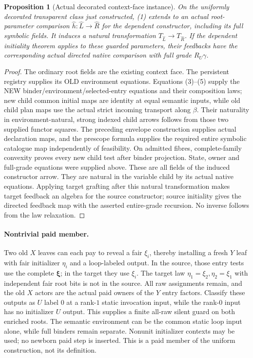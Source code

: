 \documentclass[11pt]{article}
\newtheorem{proposition}{Proposition}
\begin{document}
\begin{proposition}[Actual decorated context-face instance]
On the uniformly decorated transparent class just constructed, (1) extends to an actual root-parameter comparison $\widehat h:\widehat L\to\widehat R$ for the dependent constructor, including its full symbolic fields. It induces a natural transformation $T_{\widehat L}\to T_{\widehat R}$. If the dependent initiality theorem applies to these guarded parameters, their feedbacks have the corresponding actual directed native comparison with full grade $R_U\gamma$.
\end{proposition}
\begin{proof}
The ordinary root fields are the existing context face. The persistent registry supplies its OLD environment equations. Equations (3)--(5) supply the NEW binder/environment/selected-entry equations and their composition laws; new child common initial maps are identity at equal semantic inputs, while old child plan maps use the actual strict incoming transport along $\beta$. Their naturality in environment-natural, strong indexed child arrows follows from those two supplied functor squares. The preceding envelope construction supplies actual declaration maps, and the prescope formula supplies the required entire symbolic catalogue map independently of feasibility. On admitted fibres, complete-family convexity proves every new child test after binder projection. State, owner and full-grade equations were supplied above. These are all fields of the induced constructor arrow. They are natural in the variable child by its actual native equations. Applying target grafting after this natural transformation makes target feedback an algebra for the source constructor; source initiality gives the directed feedback map with the asserted entire-grade recursion. No inverse follows from the law relaxation.\end{proof}

\paragraph{Nontrivial paid member.}
Two old $X$ leaves can each pay to reveal a fair $\xi_i$, thereby installing a fresh $Y$ leaf with fair initializer $\eta_i$ and a loop-labeled output. In the source, those entry tests use the complete $\boldsymbol\xi$; in the target they use $\xi_i$. The target law $\eta_1=\xi_2,\eta_2=\xi_1$ with independent fair root bits is not in the source. All raw assignments remain, and the old $X$ actors are the actual paid owners of the $Y$ entry factors. Classify these outputs as $U$ label $0$ at a rank-$1$ static invocation input, while the rank-$0$ input has no initializer $U$ output. This supplies a finite all-raw silent guard on both enriched roots. The semantic environment can be the common static loop input alone, while full binders remain separate. Nonunit initializer contexts may be used; no newborn paid step is inserted. This is a paid member of the uniform construction, not its definition.
\end{document}
